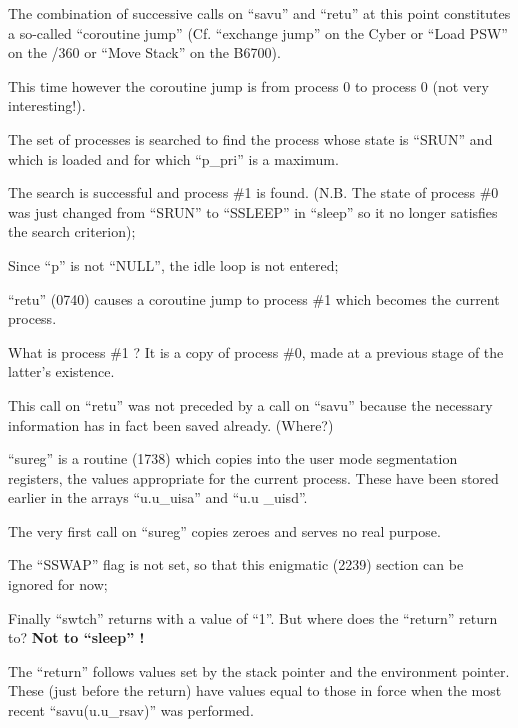The combination of successive calls on
``savu'' and ``retu'' at this point constitutes a so-called ``coroutine jump''
(Cf.
``exchange jump'' on the Cyber or ``Load
PSW'' on the /360 or ``Move Stack'' on the
B6700).

This time however the coroutine jump is
from process 0 to process 0 (not very
interesting!).

\bd
\item[2201:] The set of processes is searched
 to find the process whose state
 is ``SRUN'' and which is loaded and
 for which ``p\_pri'' is a maximum.

The search is successful and process \#1 is found. (N.B. The
state of process \#0 was just
changed from ``SRUN'' to ``SSLEEP''
in ``sleep'' so it no longer satisfies the search criterion);

\item[2218:] Since ``p'' is not ``NULL'', the idle
 loop is not entered;

\item[2228:] ``retu'' (0740) causes a coroutine
 jump to process \#1 which becomes
the current process.

What is process \#1 ? It is a copy
of process \#0, made at a previous
stage of the latter's existence.
\ed

This call on ``retu'' was not preceded by
a call on ``savu'' because the necessary
information has in fact been saved
already. (Where?)

\bd
\item[2229:] ``sureg'' is a routine (1738) which
 copies into the user mode segmentation registers, the values
 appropriate for the current process.
	These have been stored earlier in the arrays ``u.u\_uisa'' and
 ``u.u \_uisd''.
\ed

The very first call on ``sureg'' copies
zeroes and serves no real purpose.

\bd
\item[2240:] The ``SSWAP'' flag is not set, so
 that this enigmatic (2239) section can be
ignored for now;


\item[2247:] Finally ``swtch'' returns with a
 value of ``1''. But where does the ``return'' return to?
{\bf Not to ``sleep'' !}
\ed


The ``return'' follows values set by the
stack pointer and the environment
pointer. These (just before the return)
have values equal to those in force
when the most recent ``savu(u.u\_rsav)''
was performed.

